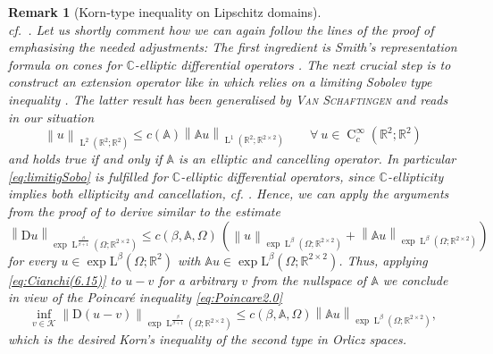 \documentclass[a4paper,10pt,reqno,oneside]{amsart}
\numberwithin{equation}{section}
\newcommand{\R}{\mathbb R}
\newcommand{\C}{\mathbb C}
\newcommand{\Aop}{\mathbb{A}}
\newcommand{\lebe}{\operatorname{L}}
\newcommand{\hold}{\operatorname{C}}
\newcommand{\D}{\mathrm{D}}
\newcommand{\norm}[1]{\left\lVert#1\right\rVert}
\renewcommand{\L}{\mathrm{L}}
\newtheorem{rem}[thm]{Remark}
\begin{document}
\begin{rem}[Korn-type inequality on Lipschitz domains]
\begin{equation*}
	\end{equation*}
 cf.~. 
	Let us shortly comment how we can again follow the lines of the proof of \cite[Thm 3.3]{Cianchi} emphasising the needed adjustments: The first ingredient is Smith's representation formula on cones for $\C$-elliptic differential operators \cite[Thm I]{Smith}. The next crucial step is to construct an extension operator like in \cite[Ch II Rem 1.3, Thm 1.2, Thm 2.2]{Temam} which relies on a limiting Sobolev type inequality \cite[Eq. (1.32)]{Temam}. The latter result has been generalised by \textsc{Van Schaftingen} \cite[Thm 1.3]{VS} and reads in our situation
	\begin{equation}\label{eq:limitigSobo}
		\norm{u}_{\lebe^{2}(\R^2;\R^2)}\le c(\Aop) \norm{\Aop u}_{\lebe^1(\R^2;\R^{2\times2})} \qquad \forall \ u\in\hold^\infty_c(\R^2;\R^2)
	\end{equation}
	and holds true if and only if $\Aop$ is an elliptic and cancelling operator. In particular \eqref{eq:limitigSobo} is fulfilled for $\C$-elliptic differential operators, since $\C$-ellipticity implies both ellipticity and cancellation, cf. \cite{GRV}. Hence, we can apply the arguments from the proof of \cite[Thm 3.3]{Cianchi} to derive similar to \cite[Eq. (6.15)]{Cianchi} the estimate
	\begin{equation}\label{eq:Cianchi(6.15)}
		\norm{\D u}_{\exp\lebe^{\frac{\beta}{\beta+1}}(\Omega;\R^{2\times 2})}\le c(\beta,\Aop,\Omega)\,\left(\norm{u}_{\exp\lebe^\beta(\Omega;\R^{2\times 2})}+\norm{\Aop u}_{\exp\lebe^\beta(\Omega;\R^{2\times 2})}\right)
	\end{equation}
	for every $u\in \exp\L^\beta(\Omega;\R^2)$ with $\Aop u\in\exp\L^\beta(\Omega;\R^{2\times2})$. Thus, applying \eqref{eq:Cianchi(6.15)} to $u-v$ for a arbitrary $v$ from the nullspace of $\Aop$ we conclude in view of the Poincaré inequality \eqref{eq:Poincare2.0}
	\begin{equation}\label{eq:Korn2}
		\inf_{v\in\mathscr{K}}\norm{\D(u-v)}_{\exp\lebe^{\frac{\beta}{\beta+1}}(\Omega;\R^{2\times 2})}\le c(\beta,\Aop,\Omega)\norm{\Aop u}_{\exp\lebe^\beta(\Omega;\R^{2\times 2})},
	\end{equation}
	which is the desired Korn's inequality of the second type in Orlicz spaces.
\end{rem}
\end{document}
